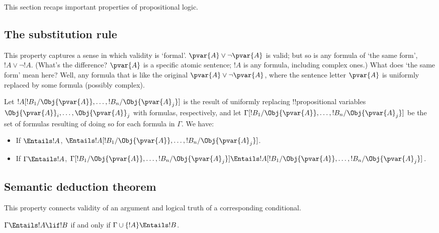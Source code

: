 \documentclass[../../../include/open-logic-section]{subfiles}
\begin{document}


This section recaps important properties of propositional logic.

\subsection{The substitution rule}

This property captures a sense in which validity is `formal'.
$\pvar{A}\lor\lnot\pvar{A}$ is valid; but so is any formula of `the
same form', $!A\lor\lnot!A$. (What's the difference? $\pvar{A}$ is a
specific atomic sentence; $!A$ is any formula, including complex
ones.) What does `the same form' mean here? Well, any formula that is
like the original $\pvar{A}\lor\lnot\pvar{A}$, where the sentence
letter $\pvar{A}$ is uniformly replaced by some formula (possibly
complex). 

\begin{thm}
    Let $!A[!B_1/\Obj{\pvar{A}},\ldots,!B_n/\Obj{\pvar{A}_j}]$ is the
    result of uniformly replacing !!{propositional variable}s
    $\Obj{\pvar{A}}_i,\ldots,\Obj{\pvar{A}}_j$ with formulas,
    respectively, and let
    $\Gamma[!B_1/\Obj{\pvar{A}},\ldots,!B_n/\Obj{\pvar{A}_j}]$ be the
    set of formulas resulting of doing so for each formula in
    $\Gamma$. We have:
    \begin{itemize}
        \item If $\Entails !A$, $\Entails
        !A[!B_1/\Obj{\pvar{A}},\ldots,!B_n/\Obj{\pvar{A}_j}]$.
        \item If $\Gamma \Entails !A$,
        $\Gamma[!B_1/\Obj{\pvar{A}},\ldots,!B_n/\Obj{\pvar{A}_j}]
        \Entails
        !A[!B_1/\Obj{\pvar{A}},\ldots,!B_n/\Obj{\pvar{A}_j}]$.
    \end{itemize}
\end{thm}

\subsection{Semantic deduction theorem}

This property connects validity of an argument and logical truth of
a corresponding conditional. 

\begin{thm}
    \begin{thm}
         $\Gamma \Entails !A \lif !B$ if and only
        if $\Gamma \cup \{!A\} \Entails !B$.
      \end{thm}
\end{thm}
\end{document}
